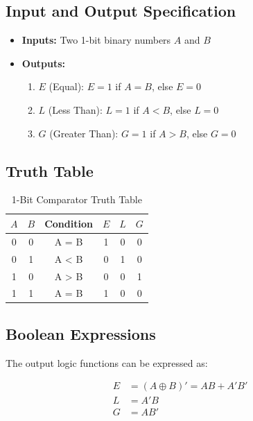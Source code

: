 \documentclass[12pt,a4paper,twoside]{report}
\begin{document}
\subsection{Input and Output Specification}

\begin{itemize}
    \item \textbf{Inputs:} Two 1-bit binary numbers $A$ and $B$
    \item \textbf{Outputs:}
    \begin{enumerate}
        \item $E$ (Equal): $E = 1$ if $A = B$, else $E = 0$
        \item $L$ (Less Than): $L = 1$ if $A < B$, else $L = 0$
        \item $G$ (Greater Than): $G = 1$ if $A > B$, else $G = 0$
    \end{enumerate}
\end{itemize}

\subsection{Truth Table}

\begin{table}[H]
\centering
\caption{1-Bit Comparator Truth Table}
\label{tab:comparator_truth}
\begin{tabularx}{\textwidth}{cccccc}
\toprule
$A$ & $B$ & Condition & $E$ & $L$ & $G$ \\
\midrule
0 & 0 & A = B & 1 & 0 & 0 \\
0 & 1 & A < B & 0 & 1 & 0 \\
1 & 0 & A > B & 0 & 0 & 1 \\
1 & 1 & A = B & 1 & 0 & 0 \\
\bottomrule
\end{tabularx}
\end{table}

\subsection{Boolean Expressions}

The output logic functions can be expressed as:

\begin{align}
E &= (A \oplus B)' = AB + A'B' \label{eq:equal}\\
L &= A'B \label{eq:less}\\
G &= AB' \label{eq:greater}
\end{align}
\end{document}
